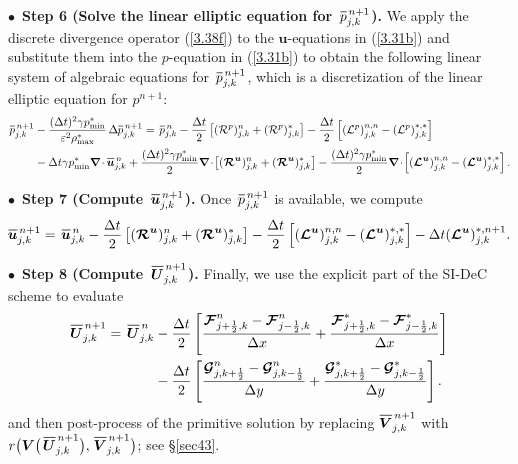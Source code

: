 \documentclass[A4paper,12pt,twoside]{article}
\numberwithin{equation}{section}
\numberwithin{figure}{section}
\numberwithin{table}{section}
\def\bnabla{\bm{\nabla}}
\newcommand{\dt}{\Delta t}
\newcommand{\dx}{\Delta x}
\newcommand{\dy}{\Delta y}
\newcommand{\kph}{{k+\frac{1}{2}}}
\newcommand{\kmh}{{k-\frac{1}{2}}}
\newcommand{\jph}{{j+\frac{1}{2}}}
\newcommand{\jmh}{{j-\frac{1}{2}}}
\newcommand{\ve}{\varepsilon}
\newcommand\eref[1]{(\ref{#1})}
\newcommand*\xbar[1]{%
  \hbox{%
    \vbox{%
      \hrule height 0.5pt %
      \kern0.4ex%
      \hbox{%
        \kern-0.05em%
        \ensuremath{#1}%
        \kern-0.00em%
      }%
    }%
  }%
}
\newcommand{\uvec}[2][3]{\boldsymbol{#2\mkern-#1mu}\mkern#1mu}
\begin{document}
\smallskip
\noindent
$\bullet\,$ \textbf{Step 6 (Solve the linear elliptic equation for $\,\xbar p^{\,n+1}_{j,k}$).} We apply the discrete divergence operator
\eref{3.38f} to the $\bm u$-equations in \eref{3.31b} and substitute them into the $p$-equation in \eref{3.31b} to obtain the following
linear system of algebraic equations for $\,\xbar p^{\,n+1}_{j,k}$, which is a discretization of the linear elliptic equation for $p^{n+1}$:
\begin{equation*}
\begin{aligned}
\xbar p^{\,n+1}_{j,k}&-\frac{(\dt)^2\gamma p_{\min}^*}{\ve^2\rho_{\max}^*}\,\Delta\xbar p_{j,k}^{\,n+1}=\,\xbar p^{\,n}_{j,k}-
\frac{\dt}{2}\left[({\cal R}^p)_{j,k}^n+({\cal R}^p)_{j,k}^*\right]-
\frac{\dt}{2}\left[({\cal L}^p)^{n,n}_{j,k}-({\cal L}^p)^{*,*}_{j,k}\right]\\
&-\dt\gamma p_{\min}^*\bnabla\!\cdot\xbar{\bm u}_{j,k}^{\,n}
+\frac{(\dt)^2\gamma p_{\min}^*}{2}\bnabla\!\cdot\!\left[(\bm{{\cal R}}^{\bm u})^n_{j,k}+(\bm{{\cal R}}^{\bm u})^*_{j,k}\right]
-\frac{(\dt)^2\gamma p_{\min}^*}{2}\bnabla\!\cdot\!\left[(\bm{{\cal L}}^{\uvec{u}})^{n,n}_{j,k}-(\bm{{\cal L}}^{\uvec{u}})^{*,*}_{j,k}\right].
\end{aligned}
\label{3.40f}
\end{equation*}

\smallskip
\noindent
$\bullet\,$ \textbf{Step 7 (Compute $\,\xbar{\bm u}^{\,n+1}_{j,k}$).} Once $\,\xbar p^{\,n+1}_{j,k}$ is available, we compute
\begin{equation*}
\begin{aligned}
\xbar{\bm u}^{\,n+1}_{j,k}=
\,\xbar{\bm u}^{\,n}_{j,k}-\frac{\dt}{2}\left[(\bm{{\cal R}}^{\bm u})^n_{j,k}+(\bm{{\cal R}}^{\bm u})^*_{j,k}\right]
-\frac{\dt}{2}\left[(\bm{{\cal L}}^{\uvec{u}})^{n,n}_{j,k}
-(\bm{{\cal L}}^{\uvec{u}})^{*,*}_{j,k}\right]-\dt(\bm{{\cal L}}^{\bm u})^{*,n+1}_{j,k}.
\end{aligned}
\end{equation*}

\smallskip
\noindent
$\bullet\,$ \textbf{Step 8 (Compute $\,\xbar{\bm U}^{\,n+1}_{j,k}$).} Finally, we use the explicit part of the SI-DeC scheme to evaluate  
\begin{equation}
\begin{aligned}
\xbar{\bm U}^{\,n+1}_{j,k}=\,\xbar{\bm U}^{\,n}_{j,k}&-\frac{\dt}{2}\left[\frac{\bm{{\cal F}}_{\jph,k}^n-\bm{{\cal F}}_{\jmh,k}^n}{\dx}+
\frac{\bm{{\cal F}}_{\jph,k}^{*}-\bm{{\cal F}}_{\jmh,k}^{*}}{\dx}\right]\\
&-\frac{\dt}{2}\left[\frac{\bm{{\cal G}}_{j,\kph}^n-\bm{{\cal G}}_{j,\kmh}^n}{\dy}+
\frac{\bm{{\cal G}}_{j,\kph}^{*}-\bm{{\cal G}}_{j,\kmh}^{*}}{\dy}\right].
\end{aligned}
\label{3.51}
\end{equation}
and then post-process of the primitive solution by replacing $\xbar{\bm V}^{\,n+1}_{j,k}$ with
$r\big(\bm V\big(\,\xbar{\bm U}^{\,n+1}_{j,k}\big),\,\xbar{\bm V}^{\,n+1}_{j,k}\big)$; see \S\ref{sec43}.
\end{document}
